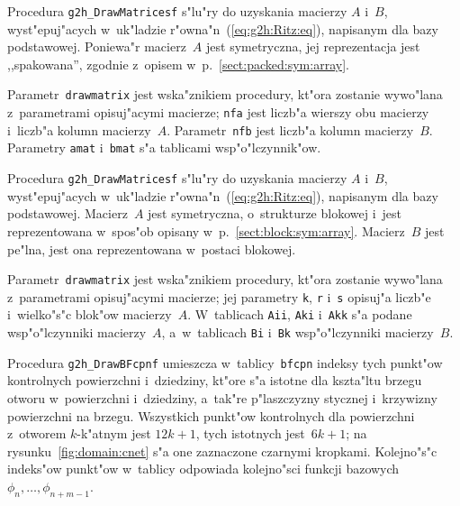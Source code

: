 \vspace{\bigskipamount}
Procedura \texttt{g2h\_DrawMatricesf} s"lu"ry do uzyskania macierzy $A$
i~$B$, wyst"epuj"acych w~uk"ladzie r"owna"n~(\ref{eq:g2h:Ritz:eq}),
napisanym dla bazy podstawowej. Poniewa"r macierz~$A$ jest symetryczna,
jej reprezentacja jest ,,spakowana'', zgodnie z~opisem
w~p.~\ref{sect:packed:sym:array}.

Parametr~\texttt{drawmatrix} jest wska"znikiem procedury, kt"ora zostanie
wywo"lana z~parametrami opisuj"acymi macierze; \texttt{nfa} jest liczb"a
wierszy obu macierzy i~liczb"a kolumn macierzy~$A$. Parametr~\texttt{nfb}
jest liczb"a kolumn macierzy~$B$. Parametry \texttt{amat} i~\texttt{bmat}
s"a tablicami wsp"o"lczynnik"ow.

\vspace{\bigskipamount}
Procedura \texttt{g2h\_DrawMatricesf} s"lu"ry do uzyskania macierzy $A$
i~$B$, wyst"epuj"acych w~uk"ladzie r"owna"n~(\ref{eq:g2h:Ritz:eq}),
napisanym dla bazy podstawowej. Macierz~$A$ jest symetryczna,
o~strukturze blokowej i~jest reprezentowana w~spos"ob opisany
w~p.~\ref{sect:block:sym:array}. Macierz~$B$ jest pe"lna, jest ona
reprezentowana w~postaci blokowej.

Parametr~\texttt{drawmatrix} jest wska"znikiem procedury, kt"ora zostanie
wywo"lana z~parametrami opisuj"acymi macierze; jej parametry \texttt{k},
\texttt{r} i~\texttt{s} opisuj"a liczb"e i~wielko"s"c blok"ow macierzy~$A$.
W~tablicach \texttt{Aii}, \texttt{Aki} i~\texttt{Akk} s"a podane
wsp"o"lczynniki macierzy~$A$, a~w~tablicach \texttt{Bi} i~\texttt{Bk}
wsp"o"lczynniki macierzy~$B$.

\vspace{\bigskipamount}
Procedura \texttt{g2h\_DrawBFcpnf} umieszcza w~tablicy~\texttt{bfcpn}
indeksy tych punkt"ow kontrolnych powierzchni i~dziedziny, kt"ore s"a
istotne dla kszta"ltu brzegu otworu w~powierzchni i~dziedziny,
a~tak"re p"laszczyzny stycznej i~krzywizny powierzchni na brzegu.
Wszystkich punkt"ow kontrolnych dla powierzchni z~otworem $k$-k"atnym jest
$12k+1$, tych istotnych jest~$6k+1$; na rysunku~\ref{fig:domain:cnet}
s"a one zaznaczone czarnymi kropkami. Kolejno"s"c indeks"ow punkt"ow
w~tablicy odpowiada kolejno"sci funkcji bazowych
$\phi_n,\ldots,\phi_{n+m-1}$.

